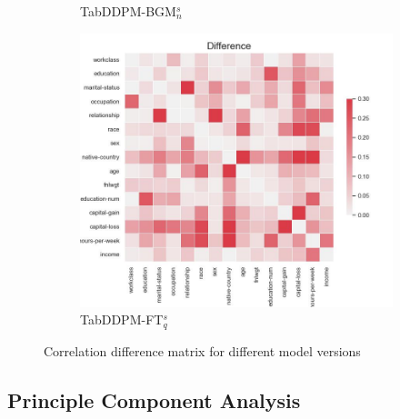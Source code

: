 \begin{figure}[h]
\begin{subfigure}{0.3\textwidth}
        \caption{TabDDPM-BGM$^{s}_n$}
    \end{subfigure}
	\begin{subfigure}{0.3\textwidth}
		\includegraphics[width=\textwidth]{images/correlation_difference/tab-ddpm-ft-simTune.jpg}
		\caption{TabDDPM-FT$^{s}_q$}
    \end{subfigure}
    \caption{Correlation difference matrix for different \gls{model} versions}
	\label{fig_a:corr_diff}
\end{figure}

\newpage
\subsection[]{Principle Component Analysis}
\label{A:pca}

